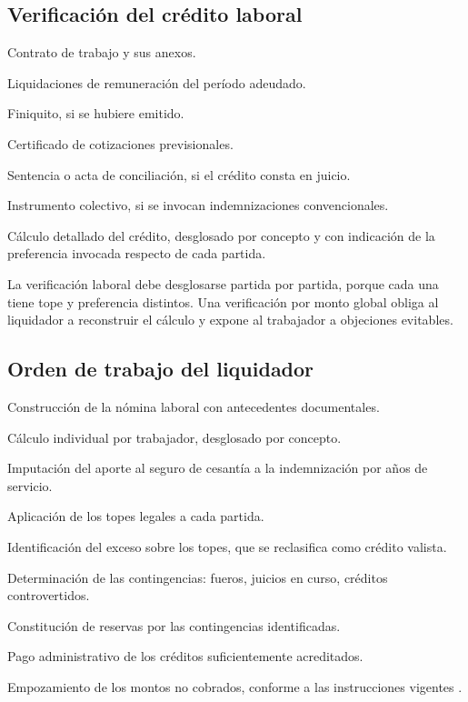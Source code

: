 \bloquePractico

\subsection{Verificación del crédito laboral}

\begin{checklist}
  \item Contrato de trabajo y sus anexos.
  \item Liquidaciones de remuneración del período adeudado.
  \item Finiquito, si se hubiere emitido.
  \item Certificado de cotizaciones previsionales.
  \item Sentencia o acta de conciliación, si el crédito consta en juicio.
  \item Instrumento colectivo, si se invocan indemnizaciones convencionales.
  \item Cálculo detallado del crédito, desglosado por concepto y con indicación de la
  preferencia invocada respecto de cada partida.
\end{checklist}

\begin{practica}
La verificación laboral debe desglosarse partida por partida, porque cada una tiene tope
y preferencia distintos. Una verificación por monto global obliga al liquidador a
reconstruir el cálculo y expone al trabajador a objeciones evitables.
\end{practica}

\subsection{Orden de trabajo del liquidador}

\begin{checklist}
  \item Construcción de la nómina laboral con antecedentes documentales.
  \item Cálculo individual por trabajador, desglosado por concepto.
  \item Imputación del aporte al seguro de cesantía a la indemnización por años de
  servicio.
  \item Aplicación de los topes legales a cada partida.
  \item Identificación del exceso sobre los topes, que se reclasifica como crédito
  valista.
  \item Determinación de las contingencias: fueros, juicios en curso, créditos
  controvertidos.
  \item Constitución de reservas por las contingencias identificadas.
  \item Pago administrativo de los créditos suficientemente acreditados.
  \item Empozamiento de los montos no cobrados, conforme a las instrucciones vigentes
  \parencite{oficio-5003}.
\end{checklist}

